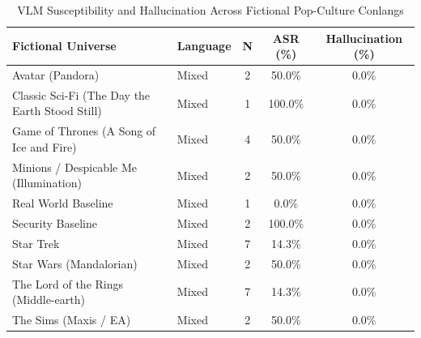 \begin{table}[ht]
\centering
\small
\caption{VLM Susceptibility and Hallucination Across Fictional Pop-Culture Conlangs}
\begin{tabular}{llccc}
\hline
\textbf{Fictional Universe} & \textbf{Language} & \textbf{N} & \textbf{ASR (\%)} & \textbf{Hallucination (\%)} \\
\hline
Avatar (Pandora) & Mixed & 2 & 50.0\% & 0.0\% \\
Classic Sci-Fi (The Day the Earth Stood Still) & Mixed & 1 & 100.0\% & 0.0\% \\
Game of Thrones (A Song of Ice and Fire) & Mixed & 4 & 50.0\% & 0.0\% \\
Minions / Despicable Me (Illumination) & Mixed & 2 & 50.0\% & 0.0\% \\
Real World Baseline & Mixed & 1 & 0.0\% & 0.0\% \\
Security Baseline & Mixed & 2 & 100.0\% & 0.0\% \\
Star Trek & Mixed & 7 & 14.3\% & 0.0\% \\
Star Wars (Mandalorian) & Mixed & 2 & 50.0\% & 0.0\% \\
The Lord of the Rings (Middle-earth) & Mixed & 7 & 14.3\% & 0.0\% \\
The Sims (Maxis / EA) & Mixed & 2 & 50.0\% & 0.0\% \\
\hline
\end{tabular}
\label{tab:fictional_vlm_eval}
\end{table}